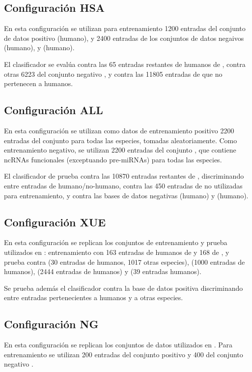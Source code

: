 \documentclass[12pt,bibliography=oldstyle,DIV=12,parskip=half-,titlepage]{scrartcl}
\begin{document}
%
\subsection{Configuración HSA}
En esta configuración se utilizan para entrenamiento 1200 entradas del
conjunto de datos positivo  (humano), y 2400 entradas
de los conjuntos de datos negaivos  (humano), y
 (humano).

El clasificador se evalúa contra las 65 entradas restantes de humanos
de , contra otras 6223 del conjunto negativo
, y contra las 11805 entradas de  que no
pertenecen a humanos.
%
\subsection{Configuración ALL}
En esta configuración se utilizan como datos de entrenamiento positivo
2200 entradas del conjunto  para todas las especies,
tomadas aleatoriamente. Como entrenamiento negativo, se utilizan 2200
entradas del conjunto , que contiene ncRNAs
funcionales (exceptuando pre-miRNAs) para todas las especies.

El clasificador de prueba contra las 10870 entradas restantes de
, discriminando entre entradas de humano/no-humano,
contra las 450 entradas de  no utilizadas para
entrenamiento, y contra las bases de datos negativas 
(humano) y  (humano).
%
\subsection{Configuración XUE}
En esta configuración se replican los conjuntos de entrenamiento y
prueba utilizados en \cite{xue}: entrenamiento con 163 entradas de
humanos de  y 168 de , y prueba contra
 (30 entradas de humanos, 1017 otras especies),
 (1000 entradas de humanos),  (2444
entradas de humanos) y  (39 entradas humanos).

Se prueba además el clasificador contra la base de datos positiva
 discriminando entre entradas pertenecientes a humanos
y a otras especies.
%
\subsection{Configuración NG}
En esta configuración se replican los conjuntos de datos utilizados en
\cite{ng}.  Para entrenamiento se utilizan 200 entradas del conjunto
positivo  y 400 del conjunto negativo .
\end{document}

